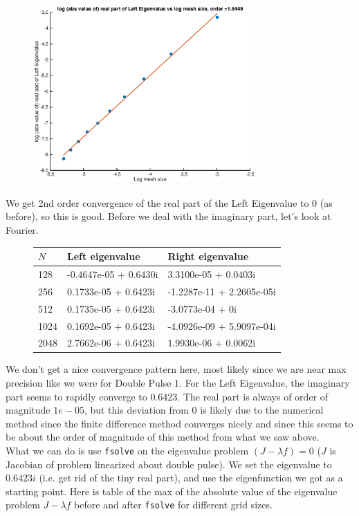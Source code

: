 \documentclass[12pt]{article}
\begin{document}
\begin{figure}[H]
\includegraphics[width=8.5cm]{1double2fdlefteigreal}
\end{figure}

We get 2nd order convergence of the real part of the Left Eigenvalue to 0 (as before), so this is good. Before we deal with the imaginary part, let's look at Fourier.

\begin{figure}[H]
\begin{tabular}{l|ll}
$N$    & Left eigenvalue      &  Right eigenvalue    \\ \hline
  128  &     -0.4647e-05 + 0.6430i &       3.3100e-05  +  0.0403i \\ 
  256  &      0.1733e-05 + 0.6423i &      -1.2287e-11  +  2.2605e-05i \\ 
  512  &      0.1735e-05 + 0.6423i &      -3.0773e-04  +  0i\\ 
  1024 &      0.1692e-05 + 0.6423i &      -4.0926e-09  +  5.9097e-04i\\
  2048 &      2.7662e-06 + 0.6423i &      1.9930e-06   +  0.0062i
\end{tabular}
\end{figure}

We don't get a nice convergence pattern here, most likely since we are near max precision like we were for Double Pulse 1. For the Left Eigenvalue, the imaginary part seems to rapidly converge to 0.6423. The real part is always of order of magnitude $1e-05$, but this deviation from 0 is likely due to the numerical method since the finite difference method converges nicely and since this seems to be about the order of magnitude of this method from what we saw above.\\

What we can do is use \texttt{fsolve} on the eigenvalue problem $(J -\lambda f) = 0$ ($J$ is Jacobian of problem linearized about double pulse). We set the eigenvalue to $0.6423i$ (i.e. get rid of the tiny real part), and use the eigenfunction we got as a starting point. Here is table of the max of the absolute value of the eigenvalue problem $J -\lambda f$ before and after \texttt{fsolve} for different grid sizes.
\end{document}
